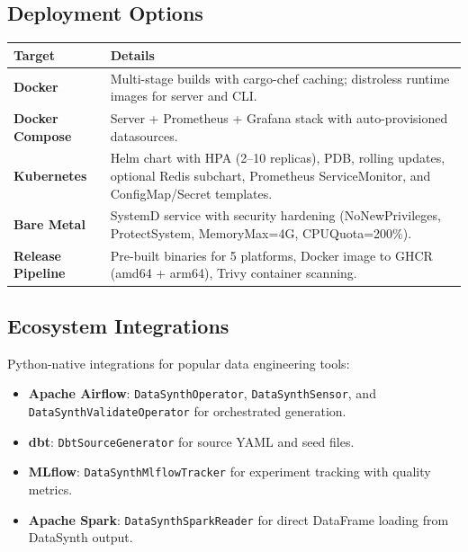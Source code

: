 \documentclass[11pt,a4paper]{article}
\begin{document}
\subsection{Deployment Options}

\vspace{0.4em}
\noindent
\renewcommand{\arraystretch}{1.2}
\begin{tabularx}{\textwidth}{>{\bfseries\color{brand}}l X}
\toprule
\textbf{Target} & \textbf{Details} \\
\midrule
Docker &
  Multi-stage builds with cargo-chef caching; distroless runtime images
  for server and CLI. \\
Docker Compose &
  Server + Prometheus + Grafana stack with auto-provisioned datasources. \\
Kubernetes &
  Helm chart with HPA (2--10 replicas), PDB, rolling updates, optional
  Redis subchart, Prometheus ServiceMonitor, and ConfigMap/Secret templates. \\
Bare Metal &
  SystemD service with security hardening (NoNewPrivileges, ProtectSystem,
  MemoryMax=4G, CPUQuota=200\%). \\
Release Pipeline &
  Pre-built binaries for 5 platforms, Docker image to GHCR (amd64 + arm64),
  Trivy container scanning. \\
\bottomrule
\end{tabularx}
\renewcommand{\arraystretch}{1.0}

\subsection{Ecosystem Integrations}

Python-native integrations for popular data engineering tools:

\begin{itemize}[leftmargin=1.4em, itemsep=2pt]
  \item \textbf{Apache Airflow}: \texttt{DataSynthOperator}, \texttt{DataSynthSensor},
        and \texttt{DataSynthValidateOperator} for orchestrated generation.
  \item \textbf{dbt}: \texttt{DbtSourceGenerator} for source YAML and seed files.
  \item \textbf{MLflow}: \texttt{DataSynthMlflowTracker} for experiment tracking
        with quality metrics.
  \item \textbf{Apache Spark}: \texttt{DataSynthSparkReader} for direct DataFrame
        loading from DataSynth output.
\end{itemize}
\end{document}
